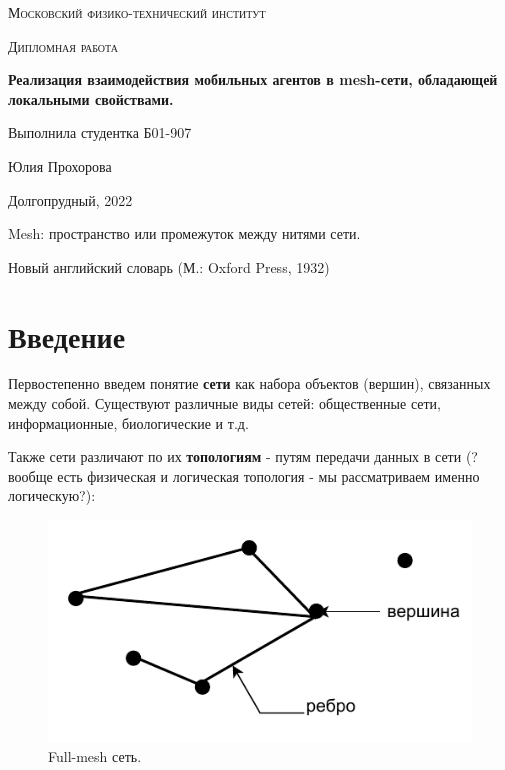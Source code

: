 \documentclass[a4paper]{article}
\begin{document}
\newcommand{\apple}{\char"F8FF}



\begin{titlepage}
    \vspace*{4cm}
	\centering
    {\scshape\LARGE Московский физико-технический институт\par}
	\vspace{1cm}
	{\scshape\Large Дипломная работа\par}
	\vspace{1cm}
    {\huge\bfseries Реализация взаимодействия мобильных агентов в mesh-сети,  обладающей  локальными свойствами. \par}
	\vspace{2cm}
	\vfill
\begin{flushright}
	{\large Выполнила студентка Б01-907}\par
	\vspace{0.3cm}
	{\LARGE Юлия Прохорова}
\end{flushright}
	
	\vfill
Долгопрудный, 2022
\end{titlepage}

\pagestyle{fancy} 
\fancyhead[C]{}
\fancyfoot[C]{ \noindent\rule{\textwidth}{0.4pt} \thepage }

\tableofcontents

\newpage

\epigraph{Mesh: пространство или промежуток между нитями сети.}{Новый английский словарь (М.: Oxford Press, 1932)}

\section{Введение}
Первостепенно введем понятие \textbf{сети} как набора объектов (вершин), связанных между собой. Существуют различные виды сетей: общественные сети, информационные, биологические и т.д. \par
Также сети различают по их \textbf{топологиям} - путям передачи данных в сети (?вообще есть физическая и логическая топология - мы рассматриваем именно логическую?):

\begin{figure}[H]
	\begin{center}
	\includegraphics[width=0.5\linewidth]{net.pdf}
	\caption{Full-mesh сеть.} 
    \label{p2}
    \end {center}
\end{figure}
\end{document}
